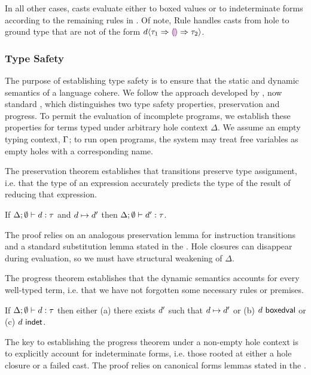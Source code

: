 In all other cases, casts evaluate either to boxed values or to
indeterminate forms according to the remaining rules
in .
%
Of note, Rule  handles casts from hole to
ground type that are not of
the form $d \langle{\tau_1}\Rightarrow{\textcolor{violet}{\llparenthesis}\textcolor{violet}{\rrparenthesis}}\Rightarrow{\tau_2}\rangle$.
%

\subsubsection{Type Safety}
%
The purpose of establishing type safety is to ensure that the static and dynamic semantics of a
language cohere.
%
We follow the approach developed by \citet{wright94:_type_soundness},
now standard \cite{pfpl}, which distinguishes two type safety
properties, preservation and progress.
%
To permit the evaluation of incomplete programs, we establish these
properties for terms typed under arbitrary hole context $\Delta$.
%
We assume an empty typing context, $\Gamma$; to run open programs, the
system may treat free variables as empty holes with a corresponding
name.

The preservation theorem establishes that transitions preserve type
assignment, i.e. that the type of an expression accurately predicts
the type of the result of reducing that expression.

\begin{thm}[Preservation]
  If $\Delta; \emptyset \vdash d : \tau$ and
  $d \mapsto d'$ then
  $\Delta; \emptyset \vdash d' : \tau$.
\end{thm}
\noindent
%
The proof relies on an analogous preservation lemma for instruction
transitions and a standard substitution lemma stated in
the \appendixName.
%
Hole closures can disappear during evaluation, so we must have structural weakening 
of $\Delta$.

The progress theorem establishes that the dynamic semantics accounts
for every well-typed term, i.e. that we have not forgotten some
necessary rules or premises.
%
\begin{thm}[Progress]
  If $\Delta; \emptyset \vdash d : \tau$ then either
  (a) there exists $d'$ such that $d \mapsto d'$ or
  (b) $d~\mathsf{boxedval}$ or
  (c) $d~\mathsf{indet}$.
\end{thm}
\noindent
The key to establishing the progress theorem under a non-empty hole
context is to explicitly account for indeterminate forms,
i.e. those rooted at either a hole closure or a failed cast.
%
The proof relies on canonical forms lemmas stated in the \appendixName.

